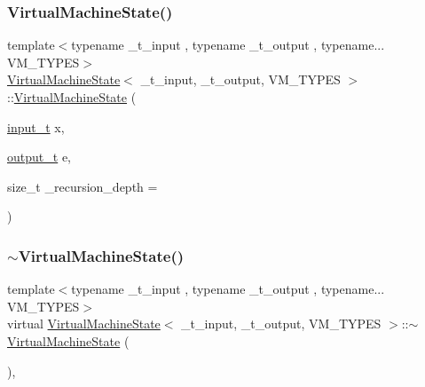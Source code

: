 \subsubsection{\texorpdfstring{Virtual\+Machine\+State()}{VirtualMachineState()}}
{\footnotesize\ttfamily template$<$typename \+\_\+t\+\_\+input , typename \+\_\+t\+\_\+output , typename... V\+M\+\_\+\+T\+Y\+P\+ES$>$ \\
\hyperlink{class_virtual_machine_state}{Virtual\+Machine\+State}$<$ \+\_\+t\+\_\+input, \+\_\+t\+\_\+output, V\+M\+\_\+\+T\+Y\+P\+ES $>$\+::\hyperlink{class_virtual_machine_state}{Virtual\+Machine\+State} (\begin{DoxyParamCaption}\item[{\hyperlink{class_virtual_machine_state_a04c5592dddd5b9ffdae5a509d73127dd}{input\+\_\+t}}]{x,  }\item[{\hyperlink{class_virtual_machine_state_a005a025f97d9505b00e7f9f0e99002bb}{output\+\_\+t}}]{e,  }\item[{size\+\_\+t}]{\+\_\+recursion\+\_\+depth = {} }\end{DoxyParamCaption})\hspace{0.3cm}{\ttfamily [inline]}}

\mbox{\label{class_virtual_machine_state_ac18b114e8adb2d8f218c5e6e7022ff2b}} 
\subsubsection{\texorpdfstring{$\sim$\+Virtual\+Machine\+State()}{~VirtualMachineState()}}
{\footnotesize\ttfamily template$<$typename \+\_\+t\+\_\+input , typename \+\_\+t\+\_\+output , typename... V\+M\+\_\+\+T\+Y\+P\+ES$>$ \\
virtual \hyperlink{class_virtual_machine_state}{Virtual\+Machine\+State}$<$ \+\_\+t\+\_\+input, \+\_\+t\+\_\+output, V\+M\+\_\+\+T\+Y\+P\+ES $>$\+::$\sim$\hyperlink{class_virtual_machine_state}{Virtual\+Machine\+State} (\begin{DoxyParamCaption}{ }\end{DoxyParamCaption})\hspace{0.3cm}{\ttfamily [inline]}, {\ttfamily [virtual]}}



